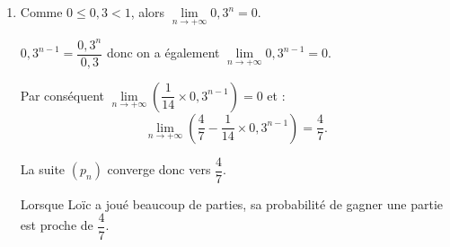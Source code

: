 \begin{corrige}
\begin{enumerate}
\begin{enumerate}[label=\alph*.]
\medskip
          \end{enumerate}
          \item
          Comme $0 \leqslant 0,3 < 1$, alors $\lim\limits_{n \rightarrow +\infty}0,3^n=0$.
          \par
          $0,3^{n-1} = \dfrac{0,3^n}{0,3}$ donc on a également  $\lim\limits_{n \rightarrow +\infty}0,3^{n-1}=0$.
          \par
          Par conséquent $\lim\limits_{n \rightarrow +\infty} \left(\dfrac{1}{14} \times 0,3^{n-1}\right)=0$ et :
          \[ \lim\limits_{n \rightarrow +\infty} \left(\dfrac{4}{7} - \dfrac{1}{14} \times 0,3^{n-1}\right)=\dfrac{4}{7}. \]
          \par
          La suite $(p_n)$ converge donc vers $\dfrac{4}{7}$.
          \par
          Lorsque Loïc a joué beaucoup de parties, sa probabilité de gagner une partie est proche de $\dfrac{4}{7}$.
          \par
     \end{enumerate}
\end{corrige}

